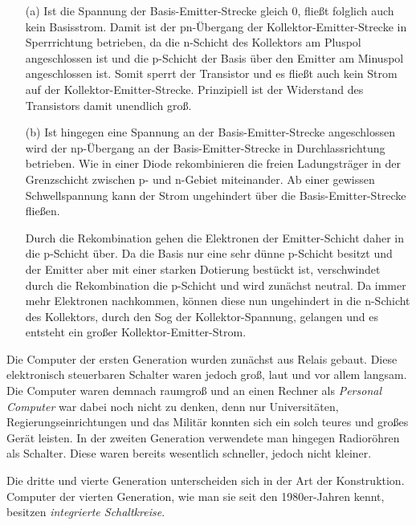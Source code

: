 \begin{ZW}
\begin{Loesung}
\end{Loesung}
%
\begin{itemize}
\item[(a)] Ist die Spannung der Basis-Emitter-Strecke gleich 0, fließt folglich auch kein Basisstrom. Damit ist der pn-Übergang der Kollektor-Emitter-Strecke in Sperrrichtung betrieben, da die n-Schicht des Kollektors am Pluspol angeschlossen ist und die p-Schicht der Basis über den Emitter am Minuspol angeschlossen ist. Somit sperrt der Transistor und es fließt auch kein Strom auf der Kollektor-Emitter-Strecke. Prinzipiell ist der Widerstand des Transistors damit unendlich groß. 
\item[(b)] Ist hingegen eine Spannung an der Basis-Emitter-Strecke angeschlossen wird der np-Übergang an der Basis-Emitter-Strecke in Durchlassrichtung betrieben. Wie in einer Diode rekombinieren die freien Ladungsträger in der Grenzschicht zwischen p- und n-Gebiet miteinander. Ab einer gewissen Schwellspannung kann der Strom ungehindert über die Basis-Emitter-Strecke fließen.

Durch die Rekombination gehen die Elektronen der Emitter-Schicht daher in die p-Schicht über. Da die Basis nur eine sehr dünne p-Schicht besitzt und der Emitter aber mit einer starken Dotierung bestückt ist, verschwindet durch die Rekombination die p-Schicht und wird zunächst neutral. Da immer mehr Elektronen nachkommen, können diese nun ungehindert in die n-Schicht des Kollektors, durch den Sog der Kollektor-Spannung, gelangen und es entsteht ein großer Kollektor-Emitter-Strom.
\end{itemize}

Die Computer der ersten Generation wurden zunächst aus Relais gebaut. Diese elektronisch steuerbaren Schalter waren jedoch groß, laut und vor allem langsam.
Die Computer waren demnach raumgroß und an einen Rechner als \emph{Personal Computer} war dabei noch nicht zu denken, denn nur Universitäten, Regierungseinrichtungen und das Militär konnten sich ein solch teures und großes Gerät leisten.
In der zweiten Generation verwendete man hingegen Radioröhren als Schalter. Diese waren bereits wesentlich schneller, jedoch nicht kleiner.

Die dritte und vierte Generation unterscheiden sich in der Art der Konstruktion. Computer der vierten Generation, wie man sie seit den 1980er-Jahren kennt, besitzen \emph{integrierte Schaltkreise}.
\end{ZW}

